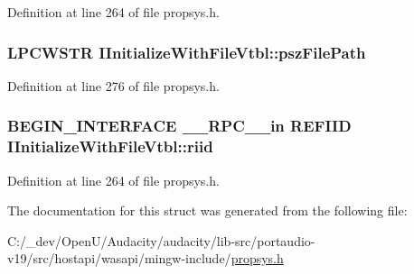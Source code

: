 Definition at line 264 of file propsys.\+h.

\subsubsection[{\texorpdfstring{psz\+File\+Path}{pszFilePath}}]{ {\bf L\+P\+C\+W\+S\+TR} I\+Initialize\+With\+File\+Vtbl\+::psz\+File\+Path}\hypertarget{struct_i_initialize_with_file_vtbl_acf1458af574fc8d211b3f16bd5e03f35}{}\label{struct_i_initialize_with_file_vtbl_acf1458af574fc8d211b3f16bd5e03f35}


Definition at line 276 of file propsys.\+h.

\subsubsection[{\texorpdfstring{riid}{riid}}]{\setlength{\rightskip}{0pt plus 5cm}B\+E\+G\+I\+N\+\_\+\+I\+N\+T\+E\+R\+F\+A\+CE {\bf \+\_\+\+\_\+\+R\+P\+C\+\_\+\+\_\+in} {\bf R\+E\+F\+I\+ID} I\+Initialize\+With\+File\+Vtbl\+::riid}\hypertarget{struct_i_initialize_with_file_vtbl_a738c925524e4e77f3b04c663a064491c}{}\label{struct_i_initialize_with_file_vtbl_a738c925524e4e77f3b04c663a064491c}


Definition at line 264 of file propsys.\+h.



The documentation for this struct was generated from the following file\+:\begin{DoxyCompactItemize}
\item 
C\+:/\+\_\+dev/\+Open\+U/\+Audacity/audacity/lib-\/src/portaudio-\/v19/src/hostapi/wasapi/mingw-\/include/\hyperlink{propsys_8h}{propsys.\+h}\end{DoxyCompactItemize}
